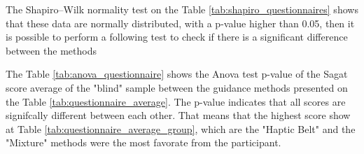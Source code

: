 The Shapiro–Wilk normality test on the Table \ref{tab:shapiro_questionnaires} shows that these data are normally distributed, with a p-value higher than 0.05, then it is possible to perform a following test to check if there is a significant difference between the methods



The Table \ref{tab:anova_questionnaire} shows the Anova test p-value of the Sagat score average of the "blind" sample between the guidance methods presented on the Table \ref{tab:questionnaire_average}. The p-value indicates that all scores are signifcally different between each other. That means that the highest score show at Table \ref{tab:questionnaire_average_group}, which are the "Haptic Belt" and the "Mixture" methods were the most favorate from the participant.



\FloatBarrier